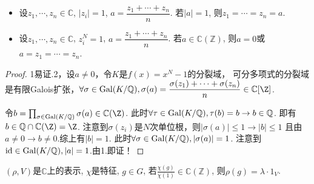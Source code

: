 \begin{proposition}
    \begin{itemize}
    \item[1] 设$z_1,\cdots,z_n\in \mathbb{C}$, $|z_i|=1$, 
    $a=\dfrac{z_1+\cdots+z_n}{n}$. 若$|a|=1$, 则$z_1=\cdots=z_n=a$.
    \item[2] 设$z_1,\cdots,z_n\in \mathbb{C}$, $z_i^N=1$, 
    $a=\dfrac{z_1+\cdots+z_n}{n}$. 若$a\in \mathbb{C}(\mathbb{Z})$, 
    则$a=0$或$a=z_1=\cdots=z_n$.
    \end{itemize}
\end{proposition}
\begin{proof}
	1易证.2，设$a\neq 0$，令$K$是$f(x)=x^N-1$的分裂域，
    可分多项式的分裂域是有限Galois扩张，$\forall \sigma \in \Gal(K/\mathbb Q),
    \sigma(a)=\dfrac{\sigma(z_1)+\cdots +\sigma(z_n)}{n}\in \mathbb C[\Z]$.
	
	令$ b= \prod_{\sigma \in \Gal(K/\mathbb Q)}\sigma(a)\in \mathbb C(\Z)$.
    此时$\forall \tau \in \operatorname{Gal}(K/\mathbb Q),\tau(b)=b\rightarrow b\in \mathbb Q$.
    即有$b\in \mathbb Q\cap \mathbb C(\Z)=\Z$.
    注意到$\sigma(z_i)$是$N$次单位根，则$|\sigma(a)|\leq 1\rightarrow |b|\leq 1$
    且由$a\neq 0\rightarrow b\neq 0$.综上有$|b|=1$.
    此时$\forall \sigma \in \operatorname{Gal}(K/\mathbb Q),|\sigma(a)|=1$.
    注意到$\operatorname{id}\in \operatorname{Gal}(K/\mathbb Q),|a|=1$.由1.即证！
\end{proof}
\begin{corollary}
    $(\rho,V)$是$\mathbb{C}$上的表示, $\chi$是特征, $g\in G$, 
    若$\frac{\chi(g)}{\chi(1)}\in \mathbb{C}(\mathbb{Z})$, 
    则$\rho(g)=\lambda \cdot 1_V$.
\end{corollary}

